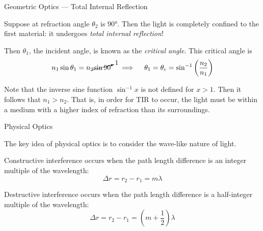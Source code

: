 \documentclass{beamer}
\begin{document}
\begin{frame}{Geometric Optics --- Total Internal Reflection}

Suppose at refraction angle $\theta_2$ is \ang{90}. Then the light is completely confined to the first material: it undergoes \emph{total internal reflection}!

\vspace{-2em}

\begin{figure}[H]
\centering
{}
\end{figure}

\vspace{-1em}

Then $\theta_1$, the incident angle, is known as the \emph{critical angle}. This critical angle is
\begin{equation*}
    n_1 \sin{\theta_1} = n_2 \cancelto{1}{\sin{90}} \quad \implies \quad \theta_1 = \theta_c = \sin^{-1}{\left( \frac{n_2}{n_1} \right)}
\end{equation*}

Note that the inverse sine function $\sin^{-1}{x}$ is not defined for $x > 1$. Then it follows that $n_1 > n_2$. That is, in order for TIR to occur, the light must be within a medium with a higher index of refraction than its surroundings.

\end{frame}

\begin{frame}{Physical Optics}

The key idea of physical optics is to consider the wave-like nature of light.

\vfill

Constructive interference occurs when the path length difference is an integer multiple of the wavelength:
\begin{equation*}
    \Delta r = r_2 - r_1 = m \lambda
\end{equation*}

Destructive interference occurs when the path length difference is a half-integer multiple of the wavelength:
\begin{equation*}
    \Delta r = r_2 - r_1 = \left( m + \frac{1}{2} \right) \lambda
\end{equation*}

\end{frame}
\end{document}
